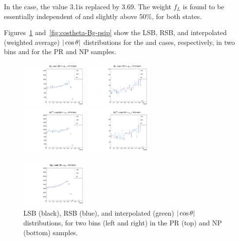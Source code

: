 In the \psip case, the value 3.1\GeV is replaced by 3.69\GeV.
The weight $f_L$ is found to be essentially independent of \pt and slightly above 50\%, for both states.

\vfill\newpage

Figures~\ref{fig:costheta-Bg-jpsi} and~\ref{fig:costheta-Bg-psip}
show the LSB, RSB, and interpolated (weighted average) 
$|\cos\theta|$ distributions for the \jpsi and \psip cases, respectively, 
in two \pt bins and for the PR and NP samples.

\begin{figure}[h!]
\centering
\includegraphics[width=0.3\textwidth]{Figures/chapter5/SB_base_full_4-jpsiPR.pdf}
\includegraphics[width=0.3\textwidth]{Figures/chapter5/SB_base_full_14-jpsiPR.pdf}\\
\includegraphics[width=0.3\textwidth]{Figures/chapter5/SB_base_full_4-jpsiNP.pdf}
\includegraphics[width=0.3\textwidth]{Figures/chapter5/SB_base_full_14-jpsiNP.pdf}
\caption{LSB (black), RSB (blue), and interpolated (green) $|\cos\theta|$ distributions,
for two \pt bins (left and right) in the PR (top) and NP (bottom) \jpsi samples.}
\label{fig:costheta-Bg-jpsi}
\centering
\includegraphics[width=0.3\textwidth]{Figures/chapter5/SB_base_full_2-psipPR.pdf}

\end{figure}
